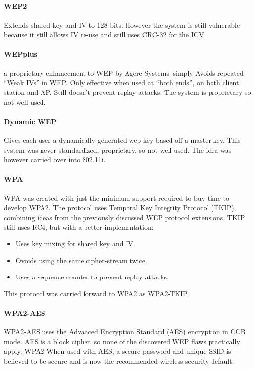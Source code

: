 \documentclass[pdftex, 12pt, a4paper]{article}
\begin{document}
\paragraph{WEP2}
Extends shared key and IV to 128 bits. However the system is still vulnerable because it still allows IV re-use and still uses CRC-32 for the ICV.
\paragraph{WEPplus} a proprietary enhancement to WEP by Agere Systems: simply Avoids repeated ``Weak IVs'' in WEP.  Only effective when used at ``both ends'', on both client station and AP. Still doesn't prevent replay attacks.
The system is proprietary so not well used.
\paragraph{Dynamic WEP}
Gives each user a dynamically generated wep key based off a master key. This system was never standardized, proprietary, so not well used. The idea was however carried over into 802.11i.

\paragraph{WPA}
WPA was created with just the minimum support required to buy time to develop WPA2.  The protocol uses Temporal Key Integrity Protocol (TKIP), combining ideas from the previously discussed WEP protocol extensions. TKIP still uses RC4, but with a better implementation:

\begin{itemize}
\item Uses key mixing for shared key and IV.
\item Ovoids using the same cipher-stream twice.
\item Uses a sequence counter to prevent replay attacks.
\end{itemize}

This protocol was carried forward to WPA2 as WPA2-TKIP.

\paragraph{WPA2-AES}
WPA2-AES uses the Advanced Encryption Standard (AES) encryption in CCB mode.
AES is a block cipher, so none of the discovered WEP flaws practically apply.  WPA2 When used with AES, a secure password and unique SSID is believed to be secure and is now the recommended wireless security default.
\end{document}
